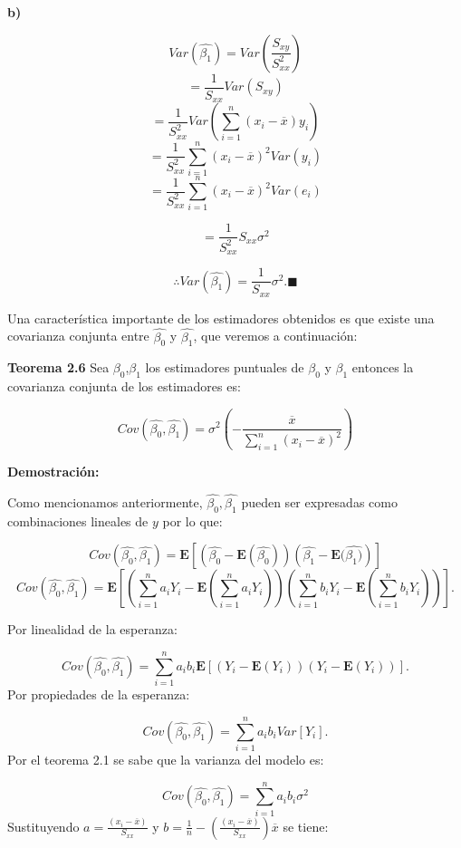 \documentclass[a4paper,oneside,openany]{book}
\begin{document}
\textbf{b)}

\[Var\left(\hat{\beta_{1}}\right)= Var\left( \frac{S_{xy}}{S_{xx}^2}\right)\]
\[= \frac{1}{S_{xx}}Var\left(S_{xy}\right)\]
\[=\frac{1}{S_{xx}^2}Var\left( \sum_{i=1}^{n}(x_{i}-\overline{x})y_{i}\right)\]
\[=\frac{1}{S_{xx}^2} \sum_{i=1}^{n}(x_{i}-\overline{x})^2Var(y_{i})\]
\[=\frac{1}{S_{xx}^2}\sum_{i=1}^{n}(x_{i}-\overline{x})^2Var(e_{i})\]

\[=\frac{1}{S_{xx}^2}S_{xx}\sigma^2\]

\[\therefore Var\left(\hat{\beta_{1}}\right)= \frac{1}{S_{xx}} \sigma^2. \blacksquare\]

Una característica importante de los estimadores obtenidos es que existe
una covarianza conjunta entre \(\hat{\beta_{0}}\) y \(\hat{\beta_{1}}\),
que veremos a continuación:

\textbf{Teorema 2.6} Sea \(\beta_{0}\),\(\beta_{1}\) los estimadores
puntuales de \(\beta_{0}\) y \(\beta_{1}\) entonces la covarianza
conjunta de los estimadores es:

\[Cov\left(\hat{\beta_{0}},\hat{\beta_{1}}\right)=\sigma^2\left(-\frac{\overline{x}}{\sum_{i=1}^{n}(x_{i}-\overline{x})^2}\right)\]

\textbf{Demostración:}

Como mencionamos anteriormente, \(\hat{\beta_{0}},\hat{\beta_{1}}\)
pueden ser expresadas como combinaciones lineales de \(y\) por lo que:

\[Cov\left(\hat{\beta_{0}},\hat{\beta_{1}} \right)= \mathbf{E}\left[ \left( \hat{\beta_{0}}-\mathbf{E}(\hat{\beta_{0}})\right)\left(\hat{\beta_{1}}-\mathbf{E}(\hat{\beta_{1})} \right) \right]\]
\[Cov\left(\hat{\beta_{0}},\hat{\beta_{1}} \right)= \mathbf{E}\left[\left(\sum_{i=1}^{n}a_{i}Y_{i}-\mathbf{E}(\sum_{i=1}^{n}a_{i}Y_{i}) \right)\left(\sum_{i=1}^{n}b_{i}Y_{i}-\mathbf{E}(\sum_{i=1}^{n}b_{i}Y_{i}) \right)\right].\]

Por linealidad de la esperanza:

\[Cov\left(\hat{\beta_{0}},\hat{\beta_{1}}\right)=\sum_{i=1}^{n}a_{i}b_{i}\mathbf{E}[(Y_{i}-\mathbf{E}(Y_{i}))(Y_{i}-\mathbf{E}(Y_{i}))].\]
Por propiedades de la esperanza:

\[Cov\left(\hat{\beta_{0}},\hat{\beta_{1}}\right)=\sum_{i=1}^{n}a_{i}b_{i}Var[Y_{i}].\]
Por el teorema 2.1 se sabe que la varianza del modelo es:

\[Cov\left(\hat{\beta_{0}},\hat{\beta_{1}}\right)=\sum_{i=1}^{n}a_{i}b_{i}\sigma^2\]
Sustituyendo \(a=\frac{(x_{i}-\overline{x})}{S_{xx}}\) y
\(b=\frac{1}{n}-\left(\frac{(x_{i}-\overline{x})}{S_{xx}}\right)\overline{x}\)
se tiene:
\end{document}
